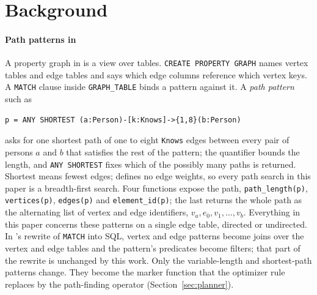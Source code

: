 \section{Background}
\label{sec:background}


\paragraph{Path patterns in \sqlpgq} A property graph in \sqlpgq is a view over tables. \texttt{CREATE PROPERTY
GRAPH} names vertex tables and edge tables and says which edge columns reference which vertex keys. A \texttt{MATCH}
clause inside \texttt{GRAPH\_TABLE} binds a pattern against it. A \emph{path pattern} such as
\begin{lstlisting}[basicstyle=\ttfamily\footnotesize, aboveskip=3pt, belowskip=3pt, xleftmargin=0pt]
p = ANY SHORTEST (a:Person)-[k:Knows]->{1,8}(b:Person)
\end{lstlisting}
asks for one shortest path of one to eight \texttt{Knows} edges between every pair of persons $a$ and $b$ that
satisfies the rest of the pattern; the quantifier bounds the length, and
\texttt{ANY SHORTEST} fixes which of the possibly many paths is returned. Shortest means fewest edges; \sqlpgq
defines no edge weights, so every path search in this paper is a breadth-first search. Four functions expose the path,
\texttt{path\_length(p)}, \texttt{vertices(p)}, \texttt{edges(p)} and \texttt{element\_id(p)}; the last returns the whole path as the alternating list of vertex and edge identifiers, $v_a, e_0, v_1, \dots, v_b$. Everything in this paper concerns these patterns on a single
edge table, directed or undirected. In \duckpgq's rewrite of \texttt{MATCH} into SQL, vertex and edge patterns become
joins over the vertex and edge tables and the pattern's predicates become filters; that part of the rewrite is
unchanged by this work. Only the variable-length and shortest-path patterns change. They become the marker function
that the optimizer rule replaces by the path-finding operator (Section~\ref{sec:planner}).

